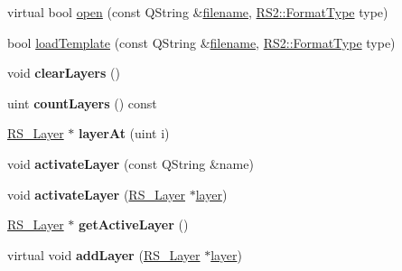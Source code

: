 \begin{DoxyCompactItemize}
\item 
virtual bool \hyperlink{classRS__Graphic_ad61d265edfd31e3979cda94b2a5e3c4a}{open} (const Q\-String \&\hyperlink{classRS__Document_aefd3d25d96ec31943bdfd1453031a423}{filename}, \hyperlink{classRS2_a077a6c94c9a0ab9962c4d4a612c7189b}{R\-S2\-::\-Format\-Type} type)
\item 
bool \hyperlink{classRS__Graphic_ad71c3d6b37d25d67c559e3614208e8dd}{load\-Template} (const Q\-String \&\hyperlink{classRS__Document_aefd3d25d96ec31943bdfd1453031a423}{filename}, \hyperlink{classRS2_a077a6c94c9a0ab9962c4d4a612c7189b}{R\-S2\-::\-Format\-Type} type)
\item 
\hypertarget{classRS__Graphic_abb04340c5df523bfb1aad3f99db3a886}{void {\bfseries clear\-Layers} ()}\label{classRS__Graphic_abb04340c5df523bfb1aad3f99db3a886}

\item 
\hypertarget{classRS__Graphic_ad7cf309f02ff596dae5bc7c524db0daa}{uint {\bfseries count\-Layers} () const }\label{classRS__Graphic_ad7cf309f02ff596dae5bc7c524db0daa}

\item 
\hypertarget{classRS__Graphic_aea9e4546090159663f3222a659766b3f}{\hyperlink{classRS__Layer}{R\-S\-\_\-\-Layer} $\ast$ {\bfseries layer\-At} (uint i)}\label{classRS__Graphic_aea9e4546090159663f3222a659766b3f}

\item 
\hypertarget{classRS__Graphic_a719f8e5c76009727cb76af6863b09a21}{void {\bfseries activate\-Layer} (const Q\-String \&name)}\label{classRS__Graphic_a719f8e5c76009727cb76af6863b09a21}

\item 
\hypertarget{classRS__Graphic_aff6b3f5c83441d0397c1e3622e13f2bf}{void {\bfseries activate\-Layer} (\hyperlink{classRS__Layer}{R\-S\-\_\-\-Layer} $\ast$\hyperlink{classRS__Entity_a6e738a0a081f97b9923787777e639b27}{layer})}\label{classRS__Graphic_aff6b3f5c83441d0397c1e3622e13f2bf}

\item 
\hypertarget{classRS__Graphic_ae2afb83803347e9cf14eb6b8a973a599}{\hyperlink{classRS__Layer}{R\-S\-\_\-\-Layer} $\ast$ {\bfseries get\-Active\-Layer} ()}\label{classRS__Graphic_ae2afb83803347e9cf14eb6b8a973a599}

\item 
\hypertarget{classRS__Graphic_a690678ca735d11678ea6aa6cc79a24b0}{virtual void {\bfseries add\-Layer} (\hyperlink{classRS__Layer}{R\-S\-\_\-\-Layer} $\ast$\hyperlink{classRS__Entity_a6e738a0a081f97b9923787777e639b27}{layer})}\label{classRS__Graphic_a690678ca735d11678ea6aa6cc79a24b0}


\end{DoxyCompactItemize}
